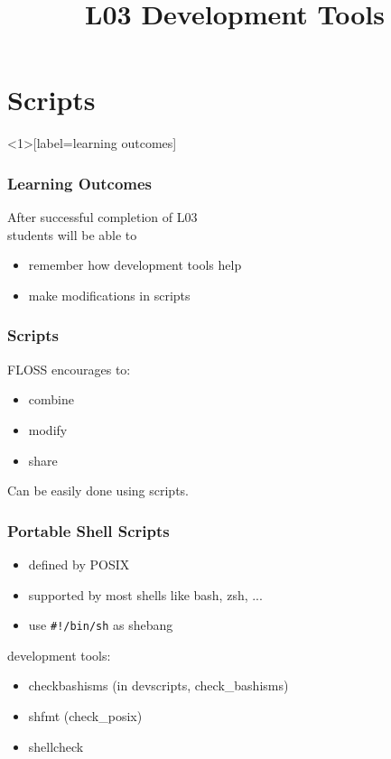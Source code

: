 

\title{L03 Development Tools}



\section{Scripts}

\begin{frame}<1>[label=learning outcomes]
	\frametitle{Learning Outcomes}
	After successful completion of L03 \\
	students will be able to

	\begin{itemize}
	\item remember how development tools help
	\item make modifications in scripts
	\end{itemize}
\end{frame}

\begin{frame}[label=scripts]
	\frametitle{Scripts}

	FLOSS encourages to:

	\begin{itemize}[<+-| alert@+>]
	\item combine
	\item modify
	\item share
	\end{itemize}

	\pause[\thebeamerpauses]

	\begin{finding}
	Can be easily done using scripts.
	\end{finding}
\end{frame}

\begin{frame}[fragile,label=portable shell scripts]
	\frametitle{Portable Shell Scripts}

	\begin{itemize}[<+-| alert@+>]
	\item defined by POSIX
	\item supported by most shells like bash, zsh, ...
	\item use \verb+#!/bin/sh+ as shebang
	\end{itemize}

	\pause[\thebeamerpauses]
	development tools:

	\begin{itemize}[<+-| alert@+>]
	\item checkbashisms (in devscripts, check\_bashisms)
	\item shfmt (check\_posix)
	\item shellcheck
	\end{itemize}
\end{frame}

